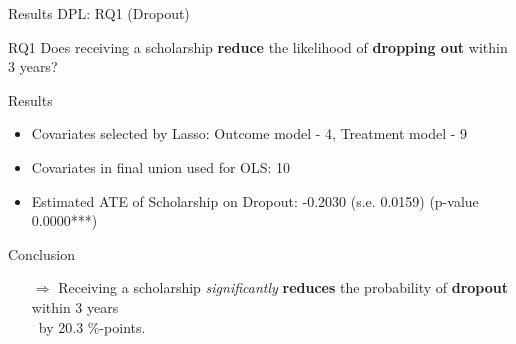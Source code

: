 \documentclass[aspectratio=169]{beamer}
\begin{document}
\begin{frame}{Results DPL: RQ1 (Dropout)}
\vspace{20pt}
    \begin{alertblock}{RQ1}
	Does receiving a scholarship \textbf{reduce} the likelihood of \textbf{dropping out} within 3 years?
	\end{alertblock}

\begin{block}{Results}
\begin{itemize}[label=--,itemsep=1pt,topsep=2pt]
	\item Covariates selected by Lasso: Outcome model - 4, Treatment model - 9
	\item Covariates in final union used for OLS: 10
	\item Estimated ATE of Scholarship on Dropout: -0.2030 (s.e. 0.0159) (p-value 0.0000***)
\end{itemize}
\end{block}

\begin{exampleblock}{Conclusion}
\vspace{-3pt}
\begin{itemize}
	\item [$\Rightarrow$]Receiving a scholarship \textit{significantly} \textbf{reduces} the probability of \textbf{dropout} within 3 years \\ by 20.3 \%-points. 
\end{itemize}
\vspace{-3pt}
\end{exampleblock}

\end{frame}
\end{document}
